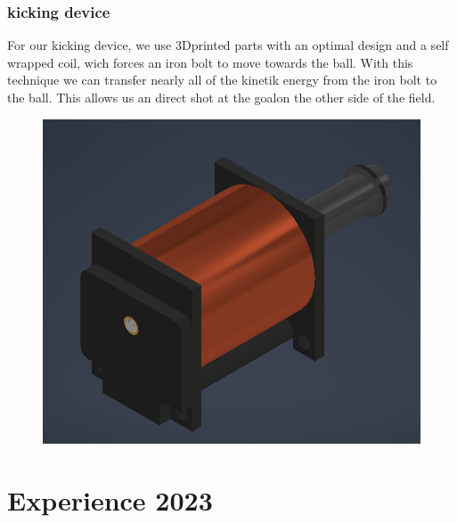 \documentclass{scrartcl}
\begin{document}
 \subsubsection{kicking device}
For our kicking device, we use 3Dprinted parts with an optimal design and a self wrapped coil, wich forces an iron bolt to move towards the ball.
With this technique we can transfer nearly all of the kinetik energy from the iron bolt to the ball. This allows us an direct
shot at the goalon the other side of the field. 
\begin{figure}[h]
    \centering
    \includegraphics[width=\textwidth]{img/Schuss.png}
    \caption{}
    \label{fig:kicking device}
\end{figure}

 \section{Experience 2023}
 
\end{document}
